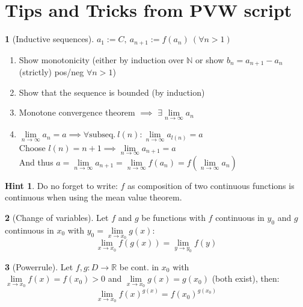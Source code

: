 \documentclass[a4paper, 10pt]{article}
\theoremstyle{definition}
\newtheorem*{note_wrapper}{Hint}
\theoremstyle{ex}
\newtheorem*{exercise}{}
\theoremstyle{named}
\newenvironment{note}%
    {\begin{mdframed}[style=trick]\begin{note_wrapper}}%
    {\end{note_wrapper}\end{mdframed}}
\newcommand{\R}{\mathbb{R}}
\newcommand{\N}{\mathbb{N}}
\begin{document}
\newpage
\section*{Tips and Tricks from PVW script}
\begin{exercise}[Inductive sequences]
    $a_1 := C, \ a_{n+1} := f(a_n) \ (\forall n > 1)$
    \begin{enumerate}
        \item Show monotonicity (either by induction over $\N$ or show $b_n = a_{n+1} - a_n$ (strictly) pos/neg $\forall n > 1$)
        \item Show that the sequence is bounded (by induction)
        \item Monotone convergence theorem $\implies$ $\exists \lim\limits_{n\to\infty} a_n$
        \item $\lim\limits_{n\to\infty} a_n = a \implies \forall\text{subseq.} \ l(n) : \lim\limits_{n\to\infty} a_{l(n)} = a$ \\
        Choose $l(n) = n + 1 \implies \lim\limits_{n\to\infty} a_{n+1} = a$ \\
        And thus $a = \lim\limits_{n\to\infty} a_{n+1} = \lim\limits_{n\to\infty} f(a_n) = f(\lim\limits_{n\to\infty} a_n)$
    \end{enumerate}
\end{exercise}

\begin{note}
    Do no forget to write: $f$ as composition of two continuous functions is continuous when using the mean value theorem.
\end{note}

\begin{exercise}[Change of variables]
    Let $f$ and $g$ be functions with $f$ continuous in $y_0$ and $g$ continuous in $x_0$ with $y_0 = \lim\limits_{x \to x_0} g(x)$:
    $$\lim_{x \to x_0} f(g(x)) = \lim_{y \to y_0} f(y)$$
\end{exercise}

\begin{exercise}[Powerrule]
    Let $f, g: D \to \R$ be cont. in $x_0$ with \\
    $\lim\limits_{x \to x_0} f(x) = f(x_0) > 0$ and $\lim\limits_{x \to x_0} g(x) = g(x_0)$ (both exist), then:
    $$\lim_{x \to x_0} f(x)^{g(x)} = f(x_0)^{g(x_0)}$$
\end{exercise}
\end{document}
